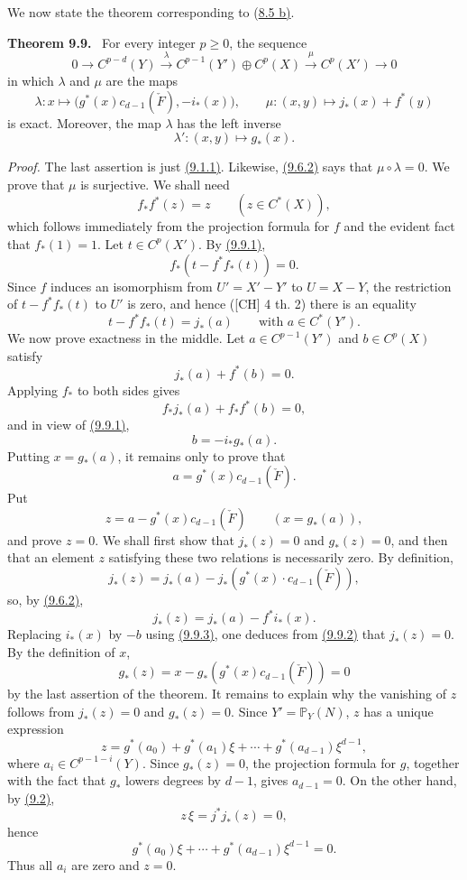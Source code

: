 \documentclass[11pt]{article}
\newenvironment{statement}[1]{\par\medskip\noindent\textbf{#1.}\ }{\par\medskip}
\begin{document}
We now state the theorem corresponding to (\hyperref[sga5:VII:proposition:8.5]{8.5 b)}.

\label{sga5:VII:theorem:9.9}\begin{statement}{Theorem 9.9}
For every integer $p\ge0$, the sequence
\[
0\to C^{p-d}(Y)\xrightarrow{\lambda} C^{p-1}(Y')\oplus C^p(X)\xrightarrow{\mu} C^p(X')\to0
\]
in which $\lambda$ and $\mu$ are the maps
\[
\lambda:x\mapsto\bigl(g^*(x)c_{d-1}(\check F),-i_*(x)\bigr),
\qquad
\mu:(x,y)\mapsto j_*(x)+f^*(y)
\]
is exact. Moreover, the map $\lambda$ has the left inverse
\[
\lambda':(x,y)\mapsto g_*(x).
\]
\end{statement}

\emph{Proof.} The last assertion is just \hyperref[sga5:VII:equation:9.1.1]{(9.1.1)}. Likewise, \hyperref[sga5:VII:equation:9.6.2]{(9.6.2)} says that $\mu\circ\lambda=0$. We prove that $\mu$ is surjective. We shall need
\[
f_*f^*(z)=z\qquad(z\in C^*(X)),
\tag{9.9.1}\label{sga5:VII:equation:9.9.1}
\]
which follows immediately from the projection formula for $f$ and the evident fact that $f_*(1)=1$. Let $t\in C^p(X')$. By \hyperref[sga5:VII:equation:9.9.1]{(9.9.1)},
\[
f_*(t-f^*f_*(t))=0.
\]
Since $f$ induces an isomorphism from $U'=X'-Y'$ to $U=X-Y$, the restriction of $t-f^*f_*(t)$ to $U'$ is zero, and hence ([CH] 4 th. 2) there is an equality
\[
t-f^*f_*(t)=j_*(a)
\qquad\text{with }a\in C^*(Y').
\]
We now prove exactness in the middle. Let $a\in C^{p-1}(Y')$ and $b\in C^p(X)$ satisfy
\[
j_*(a)+f^*(b)=0.
\tag{9.9.2}\label{sga5:VII:equation:9.9.2}
\]
Applying $f_*$ to both sides gives
\[
f_*j_*(a)+f_*f^*(b)=0,
\]
and in view of \hyperref[sga5:VII:equation:9.9.1]{(9.9.1)},
\[
b=-i_*g_*(a).
\tag{9.9.3}\label{sga5:VII:equation:9.9.3}
\]
Putting $x=g_*(a)$, it remains only to prove that
\[
a=g^*(x)c_{d-1}(\check F).
\tag{9.9.4}\label{sga5:VII:equation:9.9.4}
\]
Put
\[
z=a-g^*(x)c_{d-1}(\check F)\qquad(x=g_*(a)),
\]
and prove $z=0$. We shall first show that $j_*(z)=0$ and $g_*(z)=0$, and then that an element $z$ satisfying these two relations is necessarily zero. By definition,
\[
j_*(z)=j_*(a)-j_*(g^*(x)\cdot c_{d-1}(\check F)),
\]
so, by \hyperref[sga5:VII:equation:9.6.2]{(9.6.2)},
\[
j_*(z)=j_*(a)-f^*i_*(x).
\]
Replacing $i_*(x)$ by $-b$ using \hyperref[sga5:VII:equation:9.9.3]{(9.9.3)}, one deduces from \hyperref[sga5:VII:equation:9.9.2]{(9.9.2)} that $j_*(z)=0$. By the definition of $x$,
\[
g_*(z)=x-g_*(g^*(x)c_{d-1}(\check F))=0
\]
by the last assertion of the theorem. It remains to explain why the vanishing of $z$ follows from $j_*(z)=0$ and $g_*(z)=0$. Since $Y'=\mathbb P_Y(N)$, $z$ has a unique expression
\[
z=g^*(a_0)+g^*(a_1)\xi+\cdots+g^*(a_{d-1})\xi^{d-1},
\]
where $a_i\in C^{p-1-i}(Y)$. Since $g_*(z)=0$, the projection formula for $g$, together with the fact that $g_*$ lowers degrees by $d-1$, gives $a_{d-1}=0$. On the other hand, by \hyperref[sga5:VII:theorem:9.2]{(9.2)},
\[
z\,\xi=j^*j_*(z)=0,
\]
hence
\[
g^*(a_0)\xi+\cdots+g^*(a_{d-1})\xi^{d-1}=0.
\]
Thus all $a_i$ are zero and $z=0$.
\end{document}
